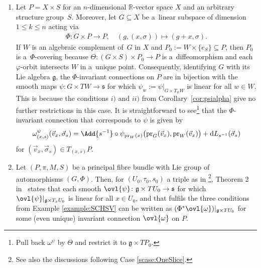 \documentclass[pdftex]{sigma}
\numberwithin{equation}{section}
\begin{document}
\begin{Example}\label{ex:transinv}\quad
\begin{enumerate}\itemsep=0pt
\item
Let $P=X \times S$ for an $n$-dimensional $\mathbb{R}$-vector space $X$ and an arbitrary structure group~$S$.
Moreover, let $G \subseteq X$ be a~linear subspace of dimension $1\leq k\leq n$ acting via
\begin{gather*}
\Phi\colon G\times P
\rightarrow P,\quad (g,(x,\sigma))\mapsto(g+x,\sigma).
\end{gather*}
If $W$ is an algebraic complement of~$G$ in $X$ and $P_0:=W\times \{e_S\}\subseteq P$, then $P_0$ is a~$\Phi$-covering because $\Theta\colon (G\times S)\times P_0\rightarrow P$ is a~dif\/feomorphism and each $\varphi$-orbit intersects $W$ in
a~unique point.
Consequently, identifying $G$ with its Lie algebra $\mathfrak{g}$, the $\Phi$-invariant connections on $P$ are in bijection with the smooth maps $\psi\colon G\times
TW\rightarrow \mathfrak{s}$ for which $\psi_w:=\psi|_{G \times T_wW}$ is linear for all $w\in W$.
This is because the conditions $i)$ and $ii)$ from Corollary~\ref{cor:psialpha} give no further
restrictions in this case.
It is straightforward to see\footnote{Pull back $\omega^\psi$ by $\Theta$ and restrict it to $\mathfrak{g}\times TP_0$.} that the $\Phi$-invariant connection that corresponds to $\psi$ is given by
\begin{gather}
\label{eq:transinv}
\omega^\psi_{(x,s)}(\vec{v}_x,\vec{\sigma}_s)
=\Add{s^{-1}}\circ\psi_{\mathrm{pr}_W(x)}\big(\mathrm{pr}_G(\vec{v}_x),\mathrm{pr}_W(\vec{v}_x)\big)+\mathrm{d}
L_{s^{-1}}(\vec{\sigma}_s)
\end{gather}
for $(\vec{v}_x,\vec{\sigma}_s)\in T_{(x,s)}P$.
\item
Let $(P,\pi,M,S)$ be a principal fibre bundle with Lie group of automorphisms $(G,\Phi)$. Then, for $(U_0,\tau_0,s_0)$ a triple as in \cite{HarSni}\footnote{See also the discussions following Case \ref{scase:OneSlice}.}, Theorem 2 in~\cite{HarSni} states that each smooth $\ovl{\psi}\colon \mathfrak{g}\times TU_0\rightarrow \mathfrak{s}$ for which $\ovl{\psi}|_{\mathfrak{g}\times T_{x}U_0}$ is linear for all $x\in U_0$, and that fulfils the three conditions from Example \ref{example:SCHSV} can be written as $(\Phi^*\ovl{\omega})|_{\mathfrak{g}\times TU_0}$ for some (even unique)
 invariant connection $\ovl{\omega}$ on $P$.


\end{enumerate}
\end{Example}
\end{document}

